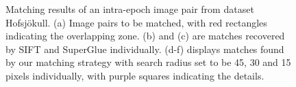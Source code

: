\begin{figure}[htbp]
\begin{center}
{\begin{minipage}[t]{0.31\linewidth}
			\end{minipage}%
		}
		\caption{Matching results of an intra-epoch image pair from dataset Hofsjökull. (a) Image pairs to be matched, with red rectangles indicating the overlapping zone.  (b) and (c) are matches recovered by SIFT and SuperGlue individually. (d-f) displays matches found by our matching strategy with search radius set to be 45, 30 and 15 pixels individually, with purple squares indicating the details.}
		\label{Matchresult}
	\end{center}
\end{figure} 

